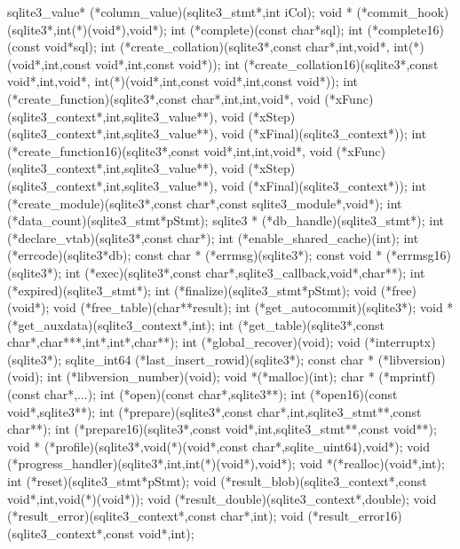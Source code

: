\begin{Codex}[label=sqlite3ext.h,numbers=left]
{  sqlite3_value* (*column_value)(sqlite3_stmt*,int iCol);
  void * (*commit_hook)(sqlite3*,int(*)(void*),void*);
  int  (*complete)(const char*sql);
  int  (*complete16)(const void*sql);
  int  (*create_collation)(sqlite3*,const char*,int,void*,
                           int(*)(void*,int,const void*,int,const void*));
  int  (*create_collation16)(sqlite3*,const void*,int,void*,
                             int(*)(void*,int,const void*,int,const void*));
  int  (*create_function)(sqlite3*,const char*,int,int,void*,
                          void (*xFunc)(sqlite3_context*,int,sqlite3_value**),
                          void (*xStep)(sqlite3_context*,int,sqlite3_value**),
                          void (*xFinal)(sqlite3_context*));
  int  (*create_function16)(sqlite3*,const void*,int,int,void*,
                            void (*xFunc)(sqlite3_context*,int,sqlite3_value**),
                            void (*xStep)(sqlite3_context*,int,sqlite3_value**),
                            void (*xFinal)(sqlite3_context*));
  int (*create_module)(sqlite3*,const char*,const sqlite3_module*,void*);
  int  (*data_count)(sqlite3_stmt*pStmt);
  sqlite3 * (*db_handle)(sqlite3_stmt*);
  int (*declare_vtab)(sqlite3*,const char*);
  int  (*enable_shared_cache)(int);
  int  (*errcode)(sqlite3*db);
  const char * (*errmsg)(sqlite3*);
  const void * (*errmsg16)(sqlite3*);
  int  (*exec)(sqlite3*,const char*,sqlite3_callback,void*,char**);
  int  (*expired)(sqlite3_stmt*);
  int  (*finalize)(sqlite3_stmt*pStmt);
  void  (*free)(void*);
  void  (*free_table)(char**result);
  int  (*get_autocommit)(sqlite3*);
  void * (*get_auxdata)(sqlite3_context*,int);
  int  (*get_table)(sqlite3*,const char*,char***,int*,int*,char**);
  int  (*global_recover)(void);
  void  (*interruptx)(sqlite3*);
  sqlite_int64  (*last_insert_rowid)(sqlite3*);
  const char * (*libversion)(void);
  int  (*libversion_number)(void);
  void *(*malloc)(int);
  char * (*mprintf)(const char*,...);
  int  (*open)(const char*,sqlite3**);
  int  (*open16)(const void*,sqlite3**);
  int  (*prepare)(sqlite3*,const char*,int,sqlite3_stmt**,const char**);
  int  (*prepare16)(sqlite3*,const void*,int,sqlite3_stmt**,const void**);
  void * (*profile)(sqlite3*,void(*)(void*,const char*,sqlite_uint64),void*);
  void  (*progress_handler)(sqlite3*,int,int(*)(void*),void*);
  void *(*realloc)(void*,int);
  int  (*reset)(sqlite3_stmt*pStmt);
  void  (*result_blob)(sqlite3_context*,const void*,int,void(*)(void*));
  void  (*result_double)(sqlite3_context*,double);
  void  (*result_error)(sqlite3_context*,const char*,int);
  void  (*result_error16)(sqlite3_context*,const void*,int);
}
\end{Codex}
